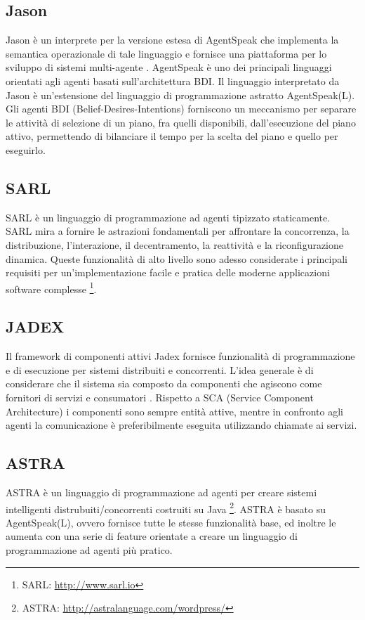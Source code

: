 
\subsection*{Jason}
Jason è un interprete per la versione estesa di AgentSpeak che implementa la semantica operazionale di tale linguaggio e fornisce una piattaforma per lo sviluppo di sistemi multi-agente \cite{JasonAgentSpeak}. AgentSpeak è uno dei principali linguaggi orientati agli agenti basati sull'architettura BDI. Il linguaggio interpretato da Jason è un'estensione del linguaggio di programmazione astratto AgentSpeak(L).
Gli agenti BDI (Belief-Desires-Intentions) forniscono un meccanismo per separare le attività di selezione di un piano, fra quelli disponibili, dall'esecuzione del piano attivo, permettendo di bilanciare il tempo per la scelta del piano e quello per eseguirlo.

\subsection*{SARL}
SARL è un linguaggio di programmazione ad agenti tipizzato staticamente. SARL mira a fornire le astrazioni fondamentali per affrontare la concorrenza, la distribuzione, l'interazione, il decentramento, la reattività e la riconfigurazione dinamica. Queste funzionalità di alto livello sono adesso considerate i principali requisiti per un'implementazione facile e pratica delle moderne applicazioni software complesse \footnote{SARL: \url{http://www.sarl.io}}.

\subsection*{JADEX}
Il framework di componenti attivi Jadex fornisce funzionalità di programmazione e di esecuzione per sistemi distribuiti e concorrenti. L'idea generale è di considerare che il sistema sia composto da componenti che agiscono come fornitori di servizi e consumatori \cite{JADEX}.
Rispetto a SCA (Service Component Architecture) i componenti sono sempre entità attive, mentre in confronto agli agenti la comunicazione è preferibilmente eseguita utilizzando chiamate ai servizi.

\subsection*{ASTRA}
ASTRA è un linguaggio di programmazione ad agenti per creare sistemi intelligenti distrubuiti/concorrenti costruiti su Java \footnote{ASTRA: \url{http://astralanguage.com/wordpress/}}.
%
ASTRA è basato su AgentSpeak(L), ovvero fornisce tutte le stesse funzionalità base, ed inoltre le aumenta con una serie di feature orientate a creare un linguaggio di programmazione ad agenti più pratico.


